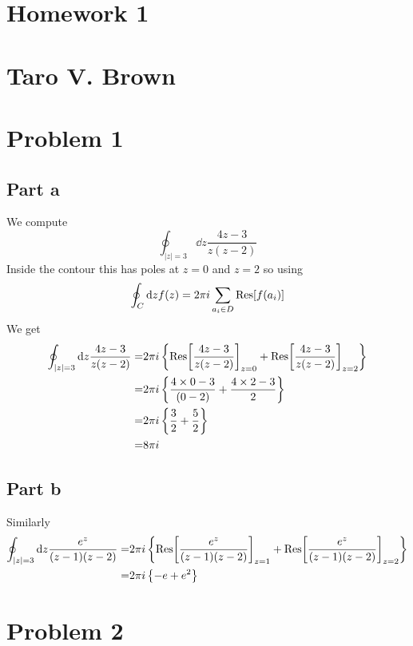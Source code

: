 \documentclass[a4paper,12pt]{article}
\begin{document}
\section*{Homework 1\\\\
Taro V. Brown}\vspace*{1cm}
\section*{Problem 1}
\subsection*{Part a}
We compute
\begin{equation}
\oint_{|z|=3} \dd z\frac{4z-3}{z(z-2)}
\end{equation}
Inside the contour this has poles at $z=0$ and $z=2$ so using 
\begin{equation}
	\oint _C \dd z  f(z)=2\pi i \sum_{a_i\in D}\Res[f(a_i)]
\end{equation}
We get
\begin{equation}
\begin{aligned}
	\oint_{|z|=3} \dd z\frac{4z-3}{z(z-2)}=&2\pi i \left\{\Res[\frac{4z-3}{z(z-2)}]_{z=0}+\Res[\frac{4z-3}{z(z-2)}]_{z=2}\right\}\\
	=&2\pi i \left\{\frac{4\times 0-3}{(0-2)}+\frac{4\times 2-3}{2}\right\}\\
	=&2\pi i \left\{\frac{3}{2}+\frac{5}{2}\right\}\\	
	=&8\pi i 
\end{aligned}
\end{equation}
\subsection*{Part b}
Similarly
\begin{equation}
	\begin{aligned}
		\oint_{|z|=3} \dd z\frac{e^z}{(z-1)(z-2)}=&2\pi i \left\{\Res[\frac{e^z}{(z-1)(z-2)}]_{z=1}+\Res[\frac{e^z}{(z-1)(z-2)}]_{z=2}\right\}\\
		=&2\pi i \left\{-e+e^2\right\}\\
	\end{aligned}
\end{equation}
\section*{Problem 2}
\end{document}
